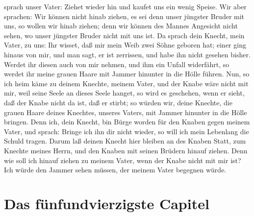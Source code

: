 \begin{schriftzitat}
sprach unser Vater: Ziehet wieder hin und kaufet uns ein wenig Speise. Wir aber sprachen: Wir können nicht hinab ziehen, es sei denn unser jüngster Bruder mit uns, so wollen wir hinab ziehen; denn wir können des Mannes Angesicht nicht sehen, wo unser jüngster Bruder nicht mit uns ist. Da sprach dein Knecht, mein Vater, zu uns: Ihr wisset, daß mir mein Weib zwei Söhne geboren hat; einer ging hinaus von mir, und man sagt, er ist zerrissen, und habe ihn nicht gesehen bisher. Werdet ihr diesen auch von mir nehmen, und ihm ein Unfall widerfährt, so werdet ihr meine grauen Haare mit Jammer hinunter in die Hölle führen. Nun, so ich heim käme zu deinem Knechte, meinem Vater, und der Knabe wäre nicht mit mir, weil seine Seele an dieses Seele hanget, so wird es geschehen, wenn er sieht, daß der Knabe nicht da ist, daß er stirbt; so würden wir, deine Knechte,
die grauen Haare deines Knechtes, unseres Vaters, mit Jammer hinunter in die Hölle bringen. Denn ich, dein Knecht, bin Bürge worden für den Knaben gegen meinem Vater, und sprach: Bringe ich ihn dir nicht wieder, so will ich mein Lebenlang die Schuld tragen. Darum laß deinen Knecht hier bleiben an des Knaben Statt, zum Knechte meines Herrn, und den Knaben mit seinen Brüdern hinauf ziehen. Denn wie soll ich hinauf ziehen zu meinem Vater, wenn der Knabe nicht mit mir ist? Ich würde den Jammer sehen müssen, der meinem Vater begegnen würde.
\end{schriftzitat}

\section{Das fünfundvierzigste Capitel}


